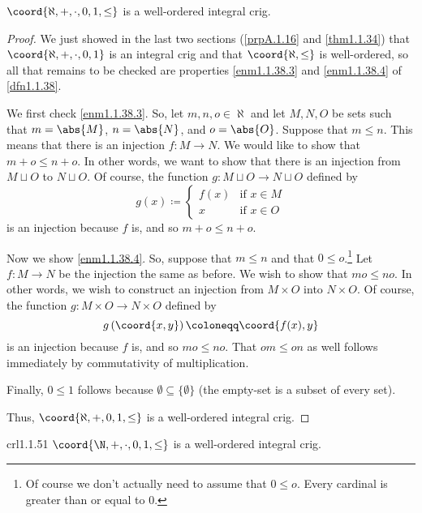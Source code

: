 \begin{prp}{}{}
$\coord{\aleph ,+,\cdot ,0,1,\leq}$ is a well-ordered integral crig.
\begin{proof}
We just showed in the last two sections (\cref{prpA.1.16} and \cref{thm1.1.34}) that $\coord{\aleph ,+,\cdot ,0,1}$ is an integral crig and that $\coord{\aleph ,\leq}$ is well-ordered, so all that remains to be checked are properties \cref{enm1.1.38.3} and \cref{enm1.1.38.4} of \cref{dfn1.1.38}.

We first check \cref{enm1.1.38.3}.  So, let $m,n,o\in \aleph$ and let $M,N,O$ be sets such that $m=\abs{M}$, $n=\abs{N}$, and $o=\abs{O}$.  Suppose that $m\leq n$.  This means that there is an injection $f\colon M\rightarrow N$.  We would like to show that $m+o\leq n+o$.  In other words, we want to show that there is an injection from $M\sqcup O$ to $N\sqcup O$.  Of course, the function $g\colon M\sqcup O\rightarrow N\sqcup O$ defined by
\begin{equation}
g(x)\coloneqq \begin{cases}f(x) & \text{if }x\in M \\ x & \text{if }x\in O\end{cases}
\end{equation}
is an injection because $f$ is, and so $m+o\leq n+o$.

Now we show \cref{enm1.1.38.4}.  So, suppose that $m\leq n$ and that $0\leq o$.\footnote{Of course we don't actually need to assume that $0\leq o$.  Every cardinal is greater than or equal to $0$.}  Let $f\colon M\rightarrow N$ be the injection the same as before.  We wish to show that $mo\leq no$.  In other words, we wish to construct an injection from $M\times O$ into $N\times O$.  Of course, the function $g\colon M\times O\rightarrow N\times O$ defined by
\begin{equation}
g\left( \coord{x,y}\right) \coloneqq \coord{f(x),y}
\end{equation}
is an injection because $f$ is, and so $mo\leq no$.  That $om\leq on$ as well follows immediately by commutativity of multiplication.

Finally, $0\leq 1$ follows because $\emptyset \subseteq \{ \emptyset \}$ (the empty-set is a subset of every set).

Thus, $\coord{\aleph ,+,0,1,\leq}$ is a well-ordered integral crig.
\end{proof}
\end{prp}
\begin{crl}{}{crl1.1.51}
$\coord{\N ,+,\cdot ,0,1,\leq}$ is a well-ordered integral crig.
\end{crl}

